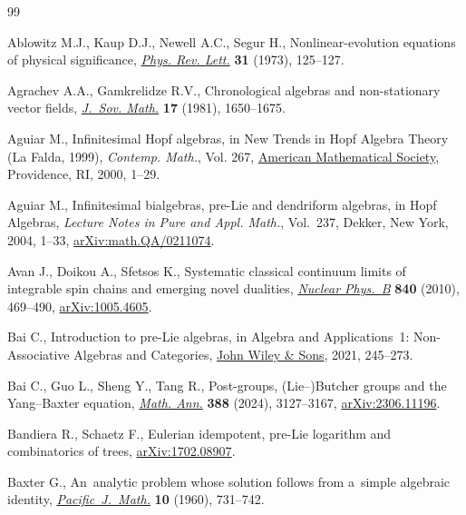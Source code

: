 \begin{thebibliography}{99}
\footnotesize\itemsep=0pt

Ablowitz M.J., Kaup D.J., Newell A.C., Segur H., Nonlinear-evolution equations
 of physical significance,
 \href{https://doi.org/10.1103/PhysRevLett.31.125}{\textit{Phys. Rev. Lett.}}
 \textbf{31} (1973), 125--127.

Agrachev A.A., Gamkrelidze R.V., Chronological algebras and non-stationary
 vector fields, \href{https://doi.org/10.1007/BF01084595}{\textit{J.~Sov.
 Math.}} \textbf{17} (1981), 1650--1675.

Aguiar M., Infinitesimal {H}opf algebras, in New Trends in {H}opf Algebra
 Theory ({L}a {F}alda, 1999), \textit{Contemp. Math.}, Vol. 267,
 \href{https://doi.org/10.1090/conm/267/04262}{American Mathematical Society},
 Providence, RI, 2000, 1--29.

Aguiar M., Infinitesimal bialgebras, pre-{L}ie and dendriform algebras, in Hopf
 Algebras, \textit{Lecture Notes in Pure and Appl. Math.}, Vol.~237, Dekker,
 New York, 2004, 1--33,
 \href{http://arxiv.org/abs/math.QA/0211074}{arXiv:math.QA/0211074}.

Avan J., Doikou A., Sfetsos K., Systematic classical continuum limits of
 integrable spin chains and emerging novel dualities,
 \href{https://doi.org/10.1016/j.nuclphysb.2010.07.014}{\textit{Nuclear
 Phys.~B}} \textbf{840} (2010), 469--490,
 \href{http://arxiv.org/abs/1005.4605}{arXiv:1005.4605}.

Bai C., Introduction to pre-{L}ie algebras, in Algebra and Applications~1:
 Non-Associative Algebras and Categories,
 \href{https://doi.org/10.1002/9781119818175.ch7}{John Wiley \& Sons}, 2021,
 245--273.

Bai C., Guo L., Sheng Y., Tang R., Post-groups, ({L}ie--){B}utcher groups and
 the {Y}ang--{B}axter equation,
 \href{https://doi.org/10.1007/s00208-023-02592-z}{\textit{Math. Ann.}}
 \textbf{388} (2024), 3127--3167,
 \href{http://arxiv.org/abs/2306.11196}{arXiv:2306.11196}.

Bandiera R., Schaetz F., Eulerian idempotent, pre-{L}ie logarithm and
 combinatorics of trees,
 \href{http://arxiv.org/abs/1702.08907}{arXiv:1702.08907}.

Baxter G., An~analytic problem whose solution follows from a~simple algebraic
 identity,
 \href{https://doi.org/10.2140/pjm.1960.10.731}{\textit{Pacific~J.~Math.}}
 \textbf{10} (1960), 731--742.


\end{thebibliography}

